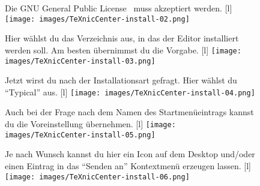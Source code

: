 \begin{figure}[hb]
	\begin{captionbeside}{%
			Die GNU General Public License~\cite{GPL} muss akzeptiert werden.%
			\label{fig:install21}}[l]
		\texttt{[image: images/TeXnicCenter-install-02.png]}
	\end{captionbeside}
	
\end{figure}

\begin{figure}[hb]
	\begin{captionbeside}{%
			Hier wählst du das Verzeichnis aus, in das der Editor installiert werden soll. Am besten übernimmst du die Vorgabe.%
			\label{fig:install22}}[l]
		\texttt{[image: images/TeXnicCenter-install-03.png]}
	\end{captionbeside}
\end{figure}

\begin{figure}[hb]
	\begin{captionbeside}{%
			Jetzt wirst du nach der Installationsart gefragt. Hier wählst du \enquote{Typical} aus.%
			\label{fig:install23}}[l]
		\texttt{[image: images/TeXnicCenter-install-04.png]}
	\end{captionbeside}
\end{figure}

\begin{figure}[hb]
	\begin{captionbeside}{%
			Auch bei der Frage nach dem Namen des Startmenüeintrags kannst du die Voreinstellung übernehmen.%
			\label{fig:install24}}[l]
		\texttt{[image: images/TeXnicCenter-install-05.png]}
	\end{captionbeside}
\end{figure}

\begin{figure}[thb]
	\begin{captionbeside}{%
			Je nach Wunsch kannst du hier ein Icon auf dem Desktop und/oder einen Eintrag in das \enquote{Senden an} Kontextmenü erzeugen lassen.%
			\label{fig:install25}}[l]
		\texttt{[image: images/TeXnicCenter-install-06.png]}
	\end{captionbeside}
\end{figure}

